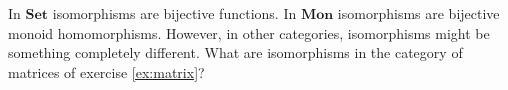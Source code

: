 \documentclass{scrartcl}
\begin{document}
\begin{enumerate}
  In $\mathbf{Set}$ isomorphisms are bijective functions.
  In $\mathbf{Mon}$ isomorphisms are bijective monoid homomorphisms.
  However, in other categories, isomorphisms might be something completely different.
  What are isomorphisms in the category of matrices of exercise \ref{ex:matrix}?
\end{enumerate}

\printbibliography
\end{document}
